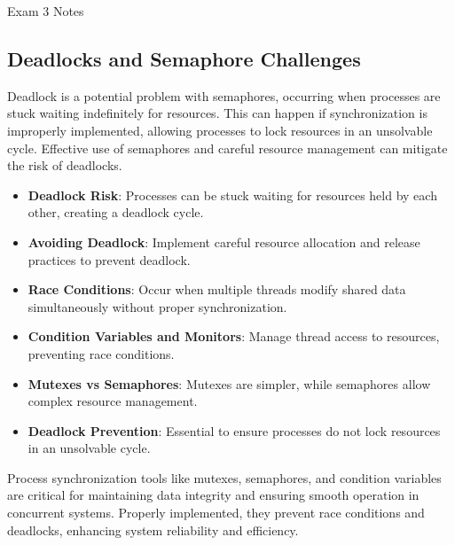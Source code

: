 \begin{examnotes}{Exam 3 Notes}
    \subsection*{Deadlocks and Semaphore Challenges}
    
    Deadlock is a potential problem with semaphores, occurring when processes are stuck waiting indefinitely for resources. This can happen if synchronization is improperly implemented, allowing processes 
    to lock resources in an unsolvable cycle. Effective use of semaphores and careful resource management can mitigate the risk of deadlocks.
    
    \begin{highlight}
        \begin{itemize}
            \item \textbf{Deadlock Risk}: Processes can be stuck waiting for resources held by each other, creating a deadlock cycle.
            \item \textbf{Avoiding Deadlock}: Implement careful resource allocation and release practices to prevent deadlock.
        \end{itemize}
    \end{highlight}
    
    \begin{highlight}
        \begin{itemize}
            \item \textbf{Race Conditions}: Occur when multiple threads modify shared data simultaneously without proper synchronization.
            \item \textbf{Condition Variables and Monitors}: Manage thread access to resources, preventing race conditions.
            \item \textbf{Mutexes vs Semaphores}: Mutexes are simpler, while semaphores allow complex resource management.
            \item \textbf{Deadlock Prevention}: Essential to ensure processes do not lock resources in an unsolvable cycle.
        \end{itemize}
    \end{highlight}
    
    Process synchronization tools like mutexes, semaphores, and condition variables are critical for maintaining data integrity and ensuring smooth operation in concurrent systems. Properly implemented, 
    they prevent race conditions and deadlocks, enhancing system reliability and efficiency.


\end{examnotes}
